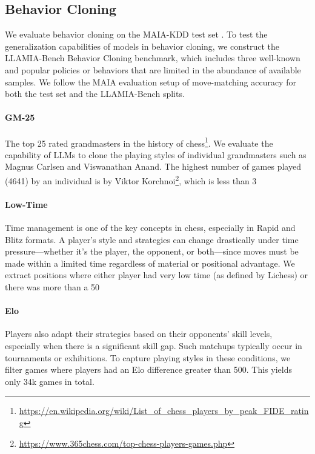 \subsection{Behavior Cloning}
We evaluate behavior cloning on the MAIA-KDD test set \cite{mcilroy2020aligning}. To test the generalization capabilities of models in behavior cloning, we construct the LLAMIA-Bench Behavior Cloning benchmark, which includes three well-known and popular policies or behaviors that are limited in the abundance of available samples. We follow the MAIA evaluation setup of move-matching accuracy for both the test set and the LLAMIA-Bench splits.

\paragraph{GM-25}
The top 25 rated grandmasters in the history of chess\footnote{\url{https://en.wikipedia.org/wiki/List_of_chess_players_by_peak_FIDE_rating}}. We evaluate the capability of LLMs to clone the playing styles of individual grandmasters such as Magnus Carlsen and Viswanathan Anand. The highest number of games played (4641) by an individual is by Viktor Korchnoi\footnote{\url{https://www.365chess.com/top-chess-players-games.php}}, which is less than 3%

\paragraph{Low-Time}
Time management is one of the key concepts in chess, especially in Rapid and Blitz formats. A player’s style and strategies can change drastically under time pressure—whether it’s the player, the opponent, or both—since moves must be made within a limited time regardless of material or positional advantage. We extract positions where either player had very low time (as defined by Lichess) or there was more than a 50%

\paragraph{Elo}
Players also adapt their strategies based on their opponents’ skill levels, especially when there is a significant skill gap. Such matchups typically occur in tournaments or exhibitions. To capture playing styles in these conditions, we filter games where players had an Elo difference greater than 500. This yields only 34k games in total.

